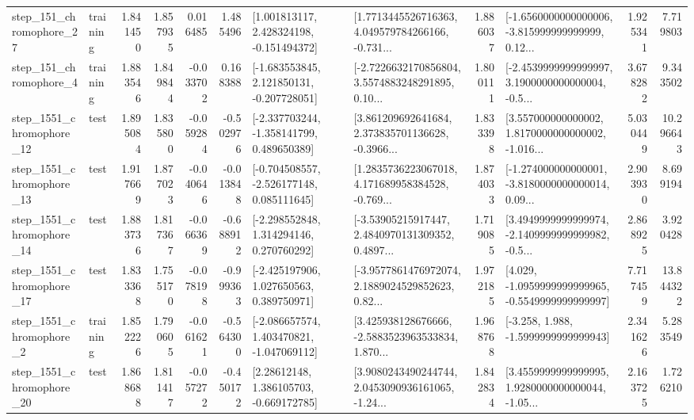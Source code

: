 \begin{tabular}{llrrrrllrlrr}
  step\_151\_chromophore\_27 &  training &      1.841450 &    1.857935 &      0.016485 &  1.485496 &    [1.001813117, 2.428324198, -0.151494372] &  [1.7713445526716363, 4.049579784266166, -0.731... &       1.886037 &  [-1.6560000000000006, -3.815999999999999, 0.12... &            1.925341 &          7.719803 \\
   step\_151\_chromophore\_4 &  training &      1.883546 &    1.849844 &     -0.033702 &  0.168388 &   [-1.683553845, 2.121850131, -0.207728051] &  [-2.7226632170856804, 3.5574883248291895, 0.10... &       1.800111 &  [-2.4539999999999997, 3.1900000000000004, -0.5... &            3.678282 &          9.343502 \\
 step\_1551\_chromophore\_12 &      test &      1.895084 &    1.835800 &     -0.059284 & -0.502976 &   [-2.337703244, -1.358141799, 0.489650389] &  [3.861209692641684, 2.373835701136628, -0.3966... &       1.833398 &  [3.557000000000002, 1.8170000000000002, -1.016... &            5.030449 &         10.296643 \\
 step\_1551\_chromophore\_13 &      test &      1.917669 &    1.877023 &     -0.040646 & -0.013848 &   [-0.704508557, -2.526177148, 0.085111645] &  [1.2835736223067018, 4.171689958384528, -0.769... &       1.874033 &  [-1.274000000000001, -3.8180000000000014, 0.09... &            2.903930 &          8.699194 \\
 step\_1551\_chromophore\_14 &      test &      1.883736 &    1.817367 &     -0.066369 & -0.688912 &    [-2.298552848, 1.314294146, 0.270760292] &  [-3.53905215917447, 2.4840970131309352, 0.4897... &       1.719085 &  [3.4949999999999974, -2.1409999999999982, -0.5... &            2.868925 &          3.920428 \\
 step\_1551\_chromophore\_17 &      test &      1.833368 &    1.755170 &     -0.078198 & -0.999363 &    [-2.425197906, 1.027650563, 0.389750971] &  [-3.9577861476972074, 2.1889024529852623, 0.82... &       1.972185 &  [4.029, -1.0959999999999965, -0.5549999999999997] &            7.717459 &         13.844322 \\
  step\_1551\_chromophore\_2 &  training &      1.852226 &    1.790605 &     -0.061621 & -0.564300 &   [-2.086657574, 1.403470821, -1.047069112] &  [3.425938128676666, -2.5883523963533834, 1.870... &       1.968768 &               [-3.258, 1.988, -1.5999999999999943] &            2.341626 &          5.283549 \\
 step\_1551\_chromophore\_20 &      test &      1.868688 &    1.811417 &     -0.057272 & -0.450172 &     [2.28612148, 1.386105703, -0.669172785] &  [3.9080243490244744, 2.0453090936161065, -1.24... &       1.842834 &  [3.4559999999999995, 1.9280000000000044, -1.05... &            2.163725 &          1.726210 \\

\end{tabular}
